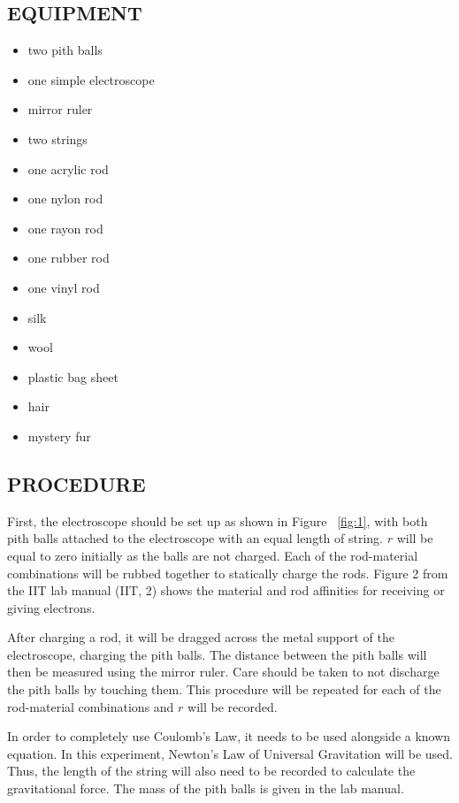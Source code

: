 \documentclass [12pt, letterpaper, twoside] {article}
\begin{document}
\subsection* {EQUIPMENT}
  \noindent
  \begin {itemize}
    \itemsep0em
    \item {two pith balls}
    \item {one simple electroscope}
    \item {mirror ruler}
    \item {two strings}
    \item {one acrylic rod}
    \item {one nylon rod}
    \item {one rayon rod}
    \item {one rubber rod}
    \item {one vinyl rod}
    \item {silk}
    \item {wool}
    \item {plastic bag sheet}
    \item {hair}
    \item {mystery fur}
  \end {itemize}

\subsection* {PROCEDURE}
First, the electroscope should be set up as shown in Figure ~\ref{fig:1}, with both pith balls attached to the electroscope with an equal length of string. \(r\) will be equal to zero initially as the balls are not charged. Each of the rod-material combinations will be rubbed together to statically charge the rods. Figure 2 from the IIT lab manual (IIT, 2) shows the material and rod affinities for receiving or giving electrons.

After charging a rod, it will be dragged across the metal support of the electroscope, charging the pith balls. The distance between the pith balls will then be measured using the mirror ruler. Care should be taken to not discharge the pith balls by touching them. This procedure will be repeated for each of the rod-material combinations and \(r\) will be recorded.

In order to completely use Coulomb's Law, it needs to be used alongside a known equation. In this experiment, Newton's Law of Universal Gravitation will be used. Thus, the length of the string will also need to be recorded to calculate the gravitational force. The mass of the pith balls is given in the lab manual.
\end{document}
